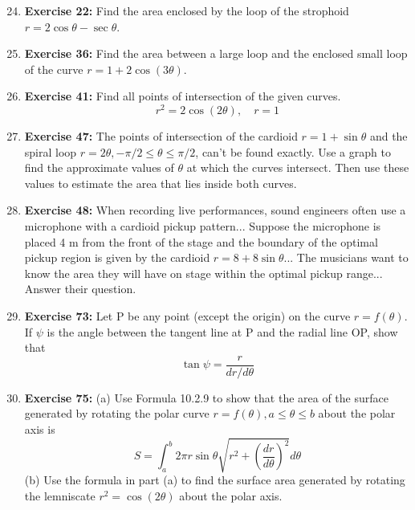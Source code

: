 \documentclass[12pt, a4paper]{article}
\begin{document}
\begin{enumerate}
    \setcounter{enumi}{23}
    \item \textbf{Exercise 22:} Find the area enclosed by the loop of the strophoid $r = 2\cos\theta - \sec\theta$.

    \item \textbf{Exercise 36:} Find the area between a large loop and the enclosed small loop of the curve $r = 1 + 2\cos(3\theta)$.

    \item \textbf{Exercise 41:} Find all points of intersection of the given curves.
    \[ r^2 = 2\cos(2\theta), \quad r = 1 \]

    \item \textbf{Exercise 47:} The points of intersection of the cardioid $r=1+\sin\theta$ and the spiral loop $r=2\theta, -\pi/2 \le \theta \le \pi/2$, can't be found exactly. Use a graph to find the approximate values of $\theta$ at which the curves intersect. Then use these values to estimate the area that lies inside both curves.

    \item \textbf{Exercise 48:} When recording live performances, sound engineers often use a microphone with a cardioid pickup pattern... Suppose the microphone is placed 4 m from the front of the stage and the boundary of the optimal pickup region is given by the cardioid $r = 8 + 8\sin\theta$... The musicians want to know the area they will have on stage within the optimal pickup range... Answer their question.

    \item \textbf{Exercise 73:} Let P be any point (except the origin) on the curve $r=f(\theta)$. If $\psi$ is the angle between the tangent line at P and the radial line OP, show that
    \[ \tan\psi = \frac{r}{dr/d\theta} \]

    \item \textbf{Exercise 75:} (a) Use Formula 10.2.9 to show that the area of the surface generated by rotating the polar curve $r=f(\theta), a \le \theta \le b$ about the polar axis is
    \[ S = \int_a^b 2\pi r \sin\theta \sqrt{r^2 + \left(\frac{dr}{d\theta}\right)^2} d\theta \]
    (b) Use the formula in part (a) to find the surface area generated by rotating the lemniscate $r^2 = \cos(2\theta)$ about the polar axis.
\end{enumerate}
\end{document}
